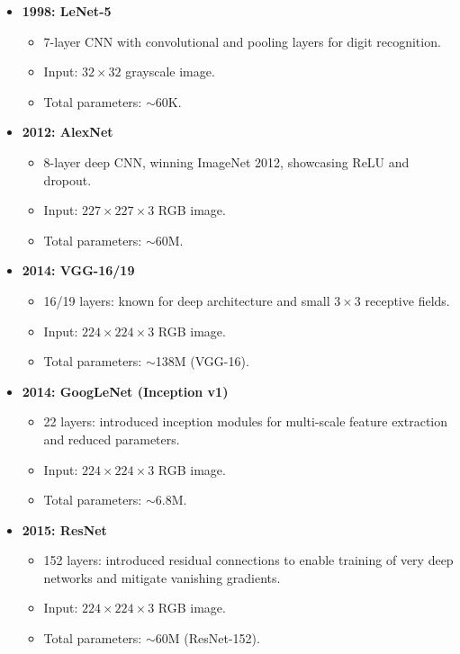 \documentclass{article}
\begin{document}
\begin{itemize}[leftmargin=1.5em]
 \item \textbf{1998: LeNet-5}
  \begin{itemize}
    \item 7-layer CNN with convolutional and pooling layers for digit recognition.
    \item Input: $32 \times 32$ grayscale image.
    \item Total parameters: $\sim$60K.
  \end{itemize}
 
 \item \textbf{2012: AlexNet} 
  \begin{itemize}
    \item 8-layer deep CNN, winning ImageNet 2012, showcasing ReLU and dropout.
    \item Input: $227 \times 227 \times 3$ RGB image.
    \item Total parameters: $\sim$60M.
  \end{itemize}
 \item \textbf{2014: VGG-16/19}
  \begin{itemize}
    \item 16/19 layers: known for deep architecture and small $3 \times 3$ receptive fields.
    \item Input: $224 \times 224 \times 3$ RGB image.
    \item Total parameters: $\sim$138M (VGG-16).
  \end{itemize}
 \item \textbf{2014: GoogLeNet (Inception v1)} 
  \begin{itemize}
    \item 22 layers: introduced inception modules for multi-scale feature extraction and reduced parameters.
    \item Input: $224 \times 224 \times 3$ RGB image.
    \item Total parameters: $\sim$6.8M.
  \end{itemize}
 \item \textbf{2015: ResNet} 
  \begin{itemize}
    \item 152 layers: introduced residual connections to enable training of very deep networks and mitigate vanishing gradients.
    \item Input: $224 \times 224 \times 3$ RGB image.
    \item Total parameters: $\sim$60M (ResNet-152).
  \end{itemize}

\end{itemize}
\end{document}
